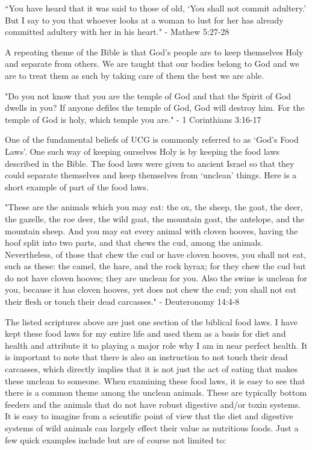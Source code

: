 \documentclass[10pt, a4paper, twocolumn]{book}
\begin{document}
\begin{formal}
	``You have heard that it was said to those of old, `You shall not commit adultery.’ But I say to you that whoever looks at a woman to lust for her has already committed adultery with her in his heart." - Mathew 5:27-28
\end{formal}

A repeating theme of the Bible is that God's people are to keep themselves Holy and separate from others. We are taught that our bodies belong to God and we are to treat them as such by taking care of them the best we are able. 

\begin{formal}
	"Do you not know that you are the temple of God and that the Spirit of God dwells in you? If anyone defiles the temple of God, God will destroy him. For the temple of God is holy, which temple you are." - 1 Corinthians 3:16-17
\end{formal}

One of the fundamental beliefs of UCG is commonly referred to as `God's Food Laws'. One such way of keeping ourselves Holy is by keeping the food laws described in the Bible. The food laws were given to ancient Israel so that they could separate themselves and keep themselves from `unclean' things. Here is a short example of part of the food laws.

\begin{formal}
	"These are the animals which you may eat: the ox, the sheep, the goat, the deer, the gazelle, the roe deer, the wild goat, the mountain goat, the antelope, and the mountain sheep. And you may eat every animal with cloven hooves, having the hoof split into two parts, and that chews the cud, among the animals. Nevertheless, of those that chew the cud or have cloven hooves, you shall not eat, such as these: the camel, the hare, and the rock hyrax; for they chew the cud but do not have cloven hooves; they are unclean for you. Also the swine is unclean for you, because it has cloven hooves, yet does not chew the cud; you shall not eat their flesh or touch their dead carcasses." - Deuteronomy 14:4-8
\end{formal}

The listed scriptures above are just one section of the biblical food laws. I have kept these food laws for my entire life and used them as a basis for diet and health and attribute it to playing a major role why I am in near perfect health. It is important to note that there is also an instruction to not touch their dead carcasses, which directly implies that it is not just the act of eating that makes these unclean to someone. When examining these food laws, it is easy to see that there is a common theme among the unclean animals. These are typically bottom feeders and the animals that do not have robust digestive and/or toxin systems. It is easy to imagine from a scientific point of view that the diet and digestive systems of wild animals can largely effect their value as nutritious foods. Just a few quick examples include but are of course not limited to: 
\end{document}
